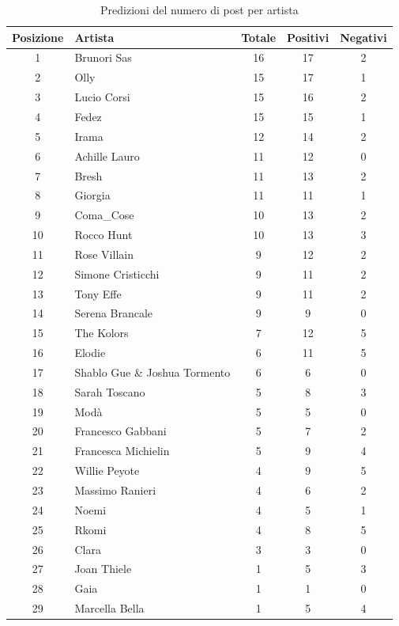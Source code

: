 \documentclass[a4paper,12pt]{article}
\begin{document}
\begin{table}[H]
  \centering
  \begin{tabular}{c l c c c}
    \toprule
    \textbf{Posizione} & \textbf{Artista} & \textbf{Totale} & \textbf{Positivi} & \textbf{Negativi} \\
    \midrule
     1 & Brunori Sas                 & 16 & 17 & 2  \\
     2 & Olly                        & 15 & 17 & 1  \\
     3 & Lucio Corsi                 & 15 & 16 & 2  \\
     4 & Fedez                       & 15 & 15 & 1  \\
     5 & Irama                       & 12 & 14 & 2  \\
     6 & Achille Lauro               & 11 & 12 & 0  \\
     7 & Bresh                       & 11 & 13 & 2  \\
     8 & Giorgia                     & 11 & 11 & 1  \\
     9 & Coma\_Cose                  & 10 & 13 & 2  \\
    10 & Rocco Hunt                  & 10 & 13 & 3  \\
    11 & Rose Villain                & 9  & 12 & 2  \\
    12 & Simone Cristicchi           & 9  & 11 & 2  \\
    13 & Tony Effe                   & 9  & 11 & 2  \\
    14 & Serena Brancale             & 9  & 9  & 0  \\
    15 & The Kolors                  & 7  & 12 & 5  \\
    16 & Elodie                      & 6  & 11 & 5  \\
    17 & Shablo Gue \& Joshua Tormento & 6  & 6  & 0  \\
    18 & Sarah Toscano               & 5  & 8  & 3  \\
    19 & Modà                        & 5  & 5  & 0  \\
    20 & Francesco Gabbani           & 5  & 7  & 2  \\
    21 & Francesca Michielin         & 5  & 9  & 4  \\
    22 & Willie Peyote               & 4  & 9  & 5  \\
    23 & Massimo Ranieri             & 4  & 6  & 2  \\
    24 & Noemi                       & 4  & 5  & 1  \\
    25 & Rkomi                       & 4  & 8  & 5  \\
    26 & Clara                       & 3  & 3  & 0  \\
    27 & Joan Thiele                 & 1  & 5  & 3  \\
    28 & Gaia                        & 1  & 1  & 0  \\
    29 & Marcella Bella              & 1  & 5  & 4  \\
    \bottomrule
  \end{tabular}
  \caption{Predizioni del numero di post per artista}
  \label{tab:predizioni_post_ultima_serata}
\end{table}
\end{document}
